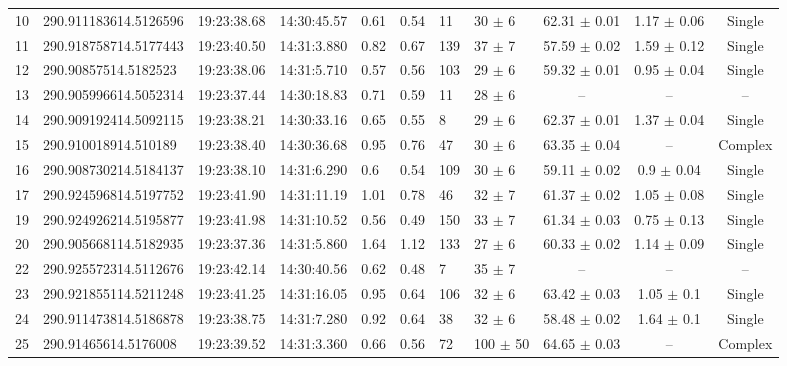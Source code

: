 \documentclass[longauth]{aa} %
\begin{document}
\begin{appendix}
\begin{table}[htbp!]
\begin{tabular}{llllllllccc}
10  &  290.911183614.5126596  &  19:23:38.68  &  14:30:45.57  &  0.61  &  0.54  &  11  &  30 $\pm$ 6  &  62.31 $\pm$ 0.01  &  1.17 $\pm$ 0.06  &  Single \\
11  &  290.918758714.5177443  &  19:23:40.50  &  14:31:3.880  &  0.82  &  0.67  &  139  &  37 $\pm$ 7  &  57.59 $\pm$ 0.02  &  1.59 $\pm$ 0.12  &  Single \\
12  &  290.90857514.5182523  &  19:23:38.06  &  14:31:5.710  &  0.57  &  0.56  &  103  &  29 $\pm$ 6  &  59.32 $\pm$ 0.01  &  0.95 $\pm$ 0.04  &  Single \\
13  &  290.905996614.5052314  &  19:23:37.44  &  14:30:18.83  &  0.71  &  0.59  &  11  &  28 $\pm$ 6  &  --  &  --  &  -- \\
14  &  290.909192414.5092115  &  19:23:38.21  &  14:30:33.16  &  0.65  &  0.55  &  8  &  29 $\pm$ 6  &  62.37 $\pm$ 0.01  &  1.37 $\pm$ 0.04  &  Single \\
15  &  290.910018914.510189  &  19:23:38.40  &  14:30:36.68  &  0.95  &  0.76  &  47  &  30 $\pm$ 6  &  63.35 $\pm$ 0.04  &  --  &  Complex \\
16  &  290.908730214.5184137  &  19:23:38.10  &  14:31:6.290  &  0.6  &  0.54  &  109  &  30 $\pm$ 6  &  59.11 $\pm$ 0.02  &  0.9 $\pm$ 0.04  &  Single \\
17  &  290.924596814.5197752  &  19:23:41.90  &  14:31:11.19  &  1.01  &  0.78  &  46  &  32 $\pm$ 7  &  61.37 $\pm$ 0.02  &  1.05 $\pm$ 0.08  &  Single \\
19  &  290.924926214.5195877  &  19:23:41.98  &  14:31:10.52  &  0.56  &  0.49  &  150  &  33 $\pm$ 7  &  61.34 $\pm$ 0.03  &  0.75 $\pm$ 0.13  &  Single \\
20  &  290.905668114.5182935  &  19:23:37.36  &  14:31:5.860  &  1.64  &  1.12  &  133  &  27 $\pm$ 6  &  60.33 $\pm$ 0.02  &  1.14 $\pm$ 0.09  &  Single \\
22  &  290.925572314.5112676  &  19:23:42.14  &  14:30:40.56  &  0.62  &  0.48  &  7  &  35 $\pm$ 7  &  --  &  --  &  -- \\
23  &  290.921855114.5211248  &  19:23:41.25  &  14:31:16.05  &  0.95  &  0.64  &  106  &  32 $\pm$ 6  &  63.42 $\pm$ 0.03  &  1.05 $\pm$ 0.1  &  Single \\
24  &  290.911473814.5186878  &  19:23:38.75  &  14:31:7.280  &  0.92  &  0.64  &  38  &  32 $\pm$ 6  &  58.48 $\pm$ 0.02  &  1.64 $\pm$ 0.1  &  Single \\
25  &  290.91465614.5176008  &  19:23:39.52  &  14:31:3.360  &  0.66  &  0.56  &  72  &  100 $\pm$ 50  &  64.65 $\pm$ 0.03  &  --  &  Complex \\

\end{tabular}
\end{table}
\end{appendix}
\end{document}
